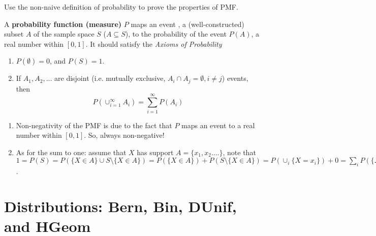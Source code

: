 \begin{exercise} 
	Use the non-naive definition of probability to prove the properties of PMF.
	\begin{hint}
		A \textbf{probability function (measure)} $P$ maps an event , a (well-constructed) subset $A$ of the sample space $S$ ($A\subseteq S$), to the probability of the event $P(A)$, a real number within $[0,1]$. It should satisfy the \textit{Axioms of Probability} 
\begin{enumerate}
	\item $P(\emptyset)=0$, and $P(S)=1$.
	\item If $A_{1},A_{2},\ldots $ are disjoint (i.e. mutually exclusive, $A_i\cap A_j=\emptyset, i\neq j$) events, then
	\begin{equation*}
		P\left(\cup_{i=1}^{\infty}A_{i}\right) = \sum_{i=1}^{\infty}P(A_{i})
	\end{equation*}
\end{enumerate}
	\end{hint}
	\begin{solution}
		\begin{enumerate}
			\item Non-negativity of the PMF is due to the fact that $P$ maps an event to a real number within $[0,1]$. So, always non-negative!
			\item As for the sum to one: assume that $X$ has support $A=\{x_1,x_2....\}$, note that $1=P(S)=P(\{X\in A\}\cup S\setminus\{X\in A \} )=P(\{X\in A\}) +P(S\setminus\{X\in A \} )=P(\cup_i \{X=x_i\}) +0=\sum_iP( \{X=x_i\})$. 
		\end{enumerate}
	\end{solution}
\end{exercise}
 
\section{Distributions: Bern, Bin, DUnif, and HGeom}
\label{sec:section-3.3}
 
